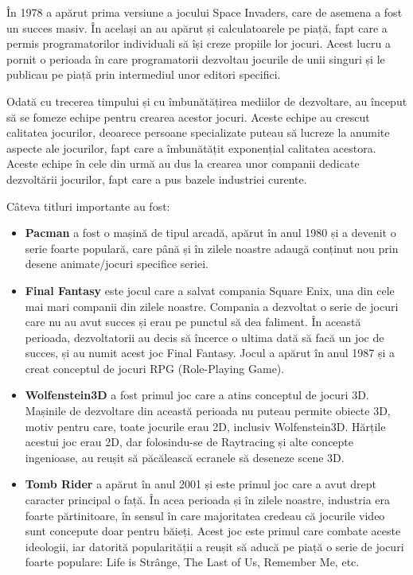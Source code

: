 \documentclass[12pt, a4paper]{article}
\begin{document}
	În 1978 a apărut prima versiune a jocului Space Invaders, care de asemena a fost un succes masiv. În același an au apărut și calculatoarele pe piață, fapt care a permis programatorilor individuali să își creze propiile lor jocuri. Acest lucru a pornit o perioada în care programatorii dezvoltau jocurile de unii singuri și le publicau pe piață prin intermediul unor editori specifici.
	\newline
	
	Odată cu trecerea timpului și cu îmbunătățirea mediilor de dezvoltare, au început să se fomeze echipe pentru crearea acestor jocuri. Aceste echipe au crescut calitatea jocurilor, deoarece persoane specializate puteau să lucreze la anumite aspecte ale jocurilor, fapt care a îmbunătățit exponențial calitatea acestora. Aceste echipe în cele din urmă au dus la crearea unor companii dedicate dezvoltării jocurilor, fapt care a pus bazele industriei curente.
	\newline
	
	Câteva titluri importante au fost:
	
	\begin{itemize}
		\item \textbf{Pacman} a fost o mașină de tipul arcadă, apărut în anul 1980 și a devenit o serie foarte populară, care până și în zilele noastre adaugă conținut nou prin desene animate/jocuri specifice seriei.
		\item \textbf{Final Fantasy} este jocul care a salvat compania Square Enix, una din cele mai mari companii din zilele noastre. Compania a dezvoltat o serie de jocuri care nu au avut succes și erau pe punctul să dea faliment. În această perioada, dezvoltatorii au decis să încerce o ultima dată să facă un joc de succes, și au numit acest joc Final Fantasy. Jocul a apărut în anul 1987 și a creat conceptul de jocuri RPG (Role-Playing Game).
		\item \textbf{Wolfenstein3D} a fost primul joc care a atins conceptul de jocuri 3D. Mașinile de dezvoltare din această perioada nu puteau permite obiecte 3D, motiv pentru care, toate jocurile erau 2D, inclusiv Wolfenstein3D. Hărțile acestui joc erau 2D, dar folosindu-se de Raytracing și alte concepte ingenioase, au reușit să păcălească ecranele să deseneze scene 3D.
		\item \textbf{Tomb Rider} a apărut în anul 2001 și este primul joc care a avut drept caracter principal o față. În acea perioada și în zilele noastre, industria era foarte părtinitoare, în sensul în care majoritatea credeau că jocurile video sunt concepute doar pentru băieți. Acest joc este primul care combate aceste ideologii, iar datorită popularității a reușit să aducă pe piață o serie de jocuri foarte populare: Life is Strânge, The Last of Us, Remember Me, etc.
	\end{itemize}	
\end{document}
